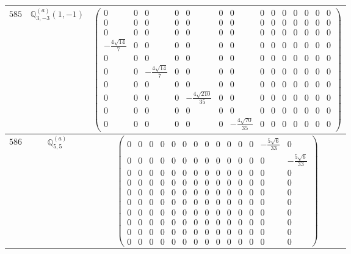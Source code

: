\documentclass[fleqn,8pt,landscape]{jsarticle}
\begin{document}
\begin{center}
\begin{longtable}{ccc}
$ 585 $ & $ \mathbb{Q}_{3,-3}^{(a)}(1,-1) $ & $ \begin{pmatrix} 0 & 0 & 0 & 0 & 0 & 0 & 0 & 0 & 0 & 0 & 0 & 0 & 0 & 0 \\ 0 & 0 & 0 & 0 & 0 & 0 & 0 & 0 & 0 & 0 & 0 & 0 & 0 & 0 \\ 0 & 0 & 0 & 0 & 0 & 0 & 0 & 0 & 0 & 0 & 0 & 0 & 0 & 0 \\ - \frac{4 \sqrt{14}}{7} & 0 & 0 & 0 & 0 & 0 & 0 & 0 & 0 & 0 & 0 & 0 & 0 & 0 \\ 0 & 0 & 0 & 0 & 0 & 0 & 0 & 0 & 0 & 0 & 0 & 0 & 0 & 0 \\ 0 & 0 & - \frac{4 \sqrt{14}}{7} & 0 & 0 & 0 & 0 & 0 & 0 & 0 & 0 & 0 & 0 & 0 \\ 0 & 0 & 0 & 0 & 0 & 0 & 0 & 0 & 0 & 0 & 0 & 0 & 0 & 0 \\ 0 & 0 & 0 & 0 & - \frac{4 \sqrt{210}}{35} & 0 & 0 & 0 & 0 & 0 & 0 & 0 & 0 & 0 \\ 0 & 0 & 0 & 0 & 0 & 0 & 0 & 0 & 0 & 0 & 0 & 0 & 0 & 0 \\ 0 & 0 & 0 & 0 & 0 & 0 & - \frac{4 \sqrt{70}}{35} & 0 & 0 & 0 & 0 & 0 & 0 & 0 \end{pmatrix} $ \\ \hline
$ 586 $ & $ \mathbb{Q}_{5,5}^{(a)} $ & $ \begin{pmatrix} 0 & 0 & 0 & 0 & 0 & 0 & 0 & 0 & 0 & 0 & 0 & 0 & - \frac{5 \sqrt{6}}{33} & 0 \\ 0 & 0 & 0 & 0 & 0 & 0 & 0 & 0 & 0 & 0 & 0 & 0 & 0 & - \frac{5 \sqrt{6}}{33} \\ 0 & 0 & 0 & 0 & 0 & 0 & 0 & 0 & 0 & 0 & 0 & 0 & 0 & 0 \\ 0 & 0 & 0 & 0 & 0 & 0 & 0 & 0 & 0 & 0 & 0 & 0 & 0 & 0 \\ 0 & 0 & 0 & 0 & 0 & 0 & 0 & 0 & 0 & 0 & 0 & 0 & 0 & 0 \\ 0 & 0 & 0 & 0 & 0 & 0 & 0 & 0 & 0 & 0 & 0 & 0 & 0 & 0 \\ 0 & 0 & 0 & 0 & 0 & 0 & 0 & 0 & 0 & 0 & 0 & 0 & 0 & 0 \\ 0 & 0 & 0 & 0 & 0 & 0 & 0 & 0 & 0 & 0 & 0 & 0 & 0 & 0 \\ 0 & 0 & 0 & 0 & 0 & 0 & 0 & 0 & 0 & 0 & 0 & 0 & 0 & 0 \\ 0 & 0 & 0 & 0 & 0 & 0 & 0 & 0 & 0 & 0 & 0 & 0 & 0 & 0 \end{pmatrix} $ \\ \hline

\end{longtable}
\end{center}
\end{document}
